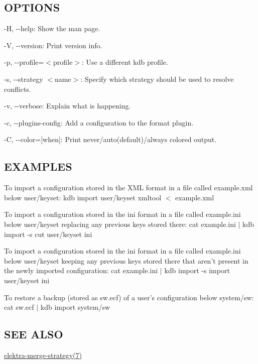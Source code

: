 \subsection*{O\+P\+T\+I\+O\+N\+S}


\begin{DoxyItemize}
\item {\ttfamily -\/\+H}, {\ttfamily -\/-\/help}\+: Show the man page.
\item {\ttfamily -\/\+V}, {\ttfamily -\/-\/version}\+: Print version info.
\item {\ttfamily -\/p}, {\ttfamily -\/-\/profile}=$<$profile$>$\+: Use a different kdb profile.
\item {\ttfamily -\/s}, {\ttfamily -\/-\/strategy $<$name$>$}\+: Specify which strategy should be used to resolve conflicts.
\item {\ttfamily -\/v}, {\ttfamily -\/-\/verbose}\+: Explain what is happening.
\item {\ttfamily -\/c}, {\ttfamily -\/-\/plugins-\/config}\+: Add a configuration to the format plugin.
\item {\ttfamily -\/\+C}, {\ttfamily -\/-\/color}=\mbox{[}when\mbox{]}\+: Print never/auto(default)/always colored output.
\end{DoxyItemize}

\subsection*{E\+X\+A\+M\+P\+L\+E\+S}

To import a configuration stored in the X\+M\+L format in a file called {\ttfamily example.\+xml} below {\ttfamily user/keyset}\+: {\ttfamily kdb import user/keyset xmltool $<$ example.\+xml}

To import a configuration stored in the {\ttfamily ini} format in a file called {\ttfamily example.\+ini} below {\ttfamily user/keyset} replacing any previous keys stored there\+: {\ttfamily cat example.\+ini $\vert$ kdb import -\/s cut user/keyset ini}

To import a configuration stored in the {\ttfamily ini} format in a file called {\ttfamily example.\+ini} below {\ttfamily user/keyset} keeping any previous keys stored there that aren't present in the newly imported configuration\+: {\ttfamily cat example.\+ini $\vert$ kdb import -\/s import user/keyset ini}

To restore a backup (stored as {\ttfamily sw.\+ecf}) of a user's configuration below {\ttfamily system/sw}\+: {\ttfamily cat sw.\+ecf $\vert$ kdb import system/sw}

\subsection*{S\+E\+E A\+L\+S\+O}


\begin{DoxyItemize}
\item \hyperlink{md_doc_help_elektra-merge-strategy_doc_help_elektra-merge-strategy_md}{elektra-\/merge-\/strategy(7)} 
\end{DoxyItemize}